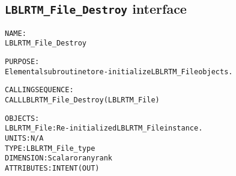 \subsection{\texttt{LBLRTM\_File\_Destroy} interface}
  \label{sec:LBLRTM_File_Destroy_interface}
  \begin{alltt}
 
  NAME:
        LBLRTM_File_Destroy
 
  PURPOSE:
        Elemental subroutine to re-initialize LBLRTM_File objects.
 
  CALLING SEQUENCE:
        CALL LBLRTM_File_Destroy( LBLRTM_File )
 
  OBJECTS:
        LBLRTM_File: Re-initialized LBLRTM_File instance.
                      UNITS:      N/A
                      TYPE:       LBLRTM_File_type
                      DIMENSION:  Scalar or any rank
                      ATTRIBUTES: INTENT(OUT)
 
  \end{alltt}
